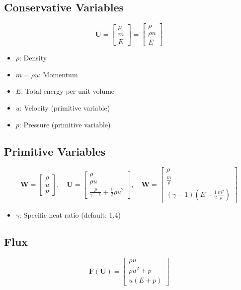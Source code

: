 \documentclass[12pt]{article}
\begin{document}
\subsection{Conservative Variables}
\[
\mathbf{U} = \begin{bmatrix} \rho \\ m \\ E \end{bmatrix} = \begin{bmatrix} \rho \\ \rho u \\ E \end{bmatrix}
\]
\begin{itemize}
    \item $\rho$: Density
    \item $m = \rho u$: Momentum
    \item $E$: Total energy per unit volume
    \item $u$: Velocity (primitive variable)
    \item $p$: Pressure (primitive variable)
\end{itemize}

\subsection{Primitive Variables}
\[
\mathbf{W} = \begin{bmatrix} \rho \\ u \\ p \end{bmatrix}, \quad \mathbf{U} = \begin{bmatrix} \rho \\ \rho u \\ \frac{p}{\gamma - 1} + \frac{1}{2} \rho u^2 \end{bmatrix}, \quad \mathbf{W} = \begin{bmatrix} \rho \\ \frac{m}{\rho} \\ (\gamma - 1) \left( E - \frac{1}{2} \frac{m^2}{\rho} \right) \end{bmatrix}
\]
\begin{itemize}
    \item $\gamma$: Specific heat ratio (default: 1.4)
\end{itemize}

\subsection{Flux}
\[
\mathbf{F}(\mathbf{U}) = \begin{bmatrix} \rho u \\ \rho u^2 + p \\ u (E + p) \end{bmatrix}
\]
\end{document}
